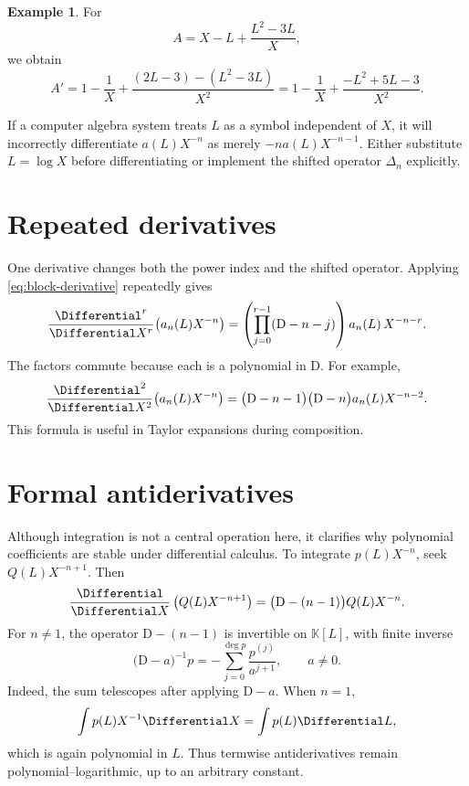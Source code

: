\documentclass[11pt,openany]{book}
\theoremstyle{definition}
\newtheorem{example}{Example}[chapter]
\theoremstyle{plain}
\theoremstyle{remark}
\newcommand{\K}{\mathbb{K}}
\newcommand{\Dop}{\mathrm{D}}
\begin{document}
\begin{example}
For
\[
 A=X-L+\frac{L^2-3L}{X},
\]
we obtain
\[
 A'=1-\frac1X
 +\frac{(2L-3)-(L^2-3L)}{X^2}
 =1-\frac1X+\frac{-L^2+5L-3}{X^2}.
\]
\end{example}

\begin{warningbox}
If a computer algebra system treats \(L\) as a symbol independent of \(X\), it
will incorrectly differentiate \(a(L)X^{-n}\) as merely
\(-na(L)X^{-n-1}\).  Either substitute \(L=\log X\) before differentiating or
implement the shifted operator \(\Delta_n\) explicitly.
\end{warningbox}

\section{Repeated derivatives}
One derivative changes both the power index and the shifted operator.  Applying
\cref{eq:block-derivative} repeatedly gives
\begin{equation}\label{eq:repeated-derivative}
 \frac{\Differential^r}{\Differential X^r}\bigl(a_n(L)X^{-n}\bigr)
 =\left(\prod_{j=0}^{r-1}(\Dop-n-j)\right)a_n(L)\,X^{-n-r}.
\end{equation}
The factors commute because each is a polynomial in \(\Dop\).  For example,
\[
 \frac{\Differential^2}{\Differential X^2}\bigl(a_n(L)X^{-n}\bigr)
 =\bigl(\Dop-n-1\bigr)\bigl(\Dop-n\bigr)a_n(L)X^{-n-2}.
\]
This formula is useful in Taylor expansions during composition.

\section{Formal antiderivatives}
Although integration is not a central operation here, it clarifies why
polynomial coefficients are stable under differential calculus.  To integrate
\(p(L)X^{-n}\), seek \(Q(L)X^{-n+1}\).  Then
\[
 \frac{\Differential}{\Differential X}\left(Q(L)X^{-n+1}\right)
 =\bigl(\Dop-(n-1)\bigr)Q(L)X^{-n}.
\]
For \(n\ne1\), the operator \(\Dop-(n-1)\) is invertible on \(\K[L]\), with
finite inverse
\begin{equation}\label{eq:operator-inverse-polynomials}
 \bigl(\Dop-a\bigr)^{-1}p
 =-\sum_{j=0}^{\deg p}\frac{p^{(j)}}{a^{j+1}},
 \qquad a\ne0.
\end{equation}
Indeed, the sum telescopes after applying \(\Dop-a\).  When \(n=1\),
\[
 \int p(L)X^{-1}\Differential X=\int p(L)\Differential L,
\]
which is again polynomial in \(L\).  Thus termwise antiderivatives remain
polynomial--logarithmic, up to an arbitrary constant.
\end{document}
